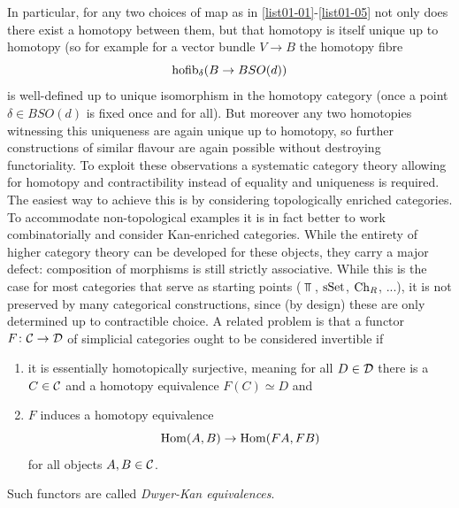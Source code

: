     In particular, for any two choices of map as in \ref{list01-01}-\ref{list01-05} not only does there exist a homotopy between them, but that homotopy is itself unique up to homotopy (so for example for a vector bundle $V \to B$ the homotopy fibre
    \begin{equation*}
        \operatorname{hofib}_{\delta}(B \to BSO(d))
    \end{equation*}
    is well-defined up to unique isomorphism in the homotopy category (once a point $\delta \in BSO(d)$ is fixed once and for all). But moreover any two homotopies witnessing this uniqueness are again unique up to homotopy, so further constructions of similar flavour are again possible without destroying functoriality.
    To exploit these observations a systematic category theory allowing for homotopy and contractibility instead of equality and uniqueness is required. The easiest way to achieve this is by considering topologically enriched categories. To accommodate non-topological examples it is in fact better to work combinatorially and consider Kan-enriched categories. While the entirety of higher category theory can be developed for these objects, they carry a major defect: composition of morphisms is still strictly associative. While this is the case for most categories that serve as starting points ($\Top$, $\operatorname{sSet}$, $\operatorname{Ch}_R$, ...), it is not preserved by many categorical constructions, since (by design) these are only determined up to contractible choice.
    A related problem is that a functor $F \colon \mathcal{C} \to \mathcal{D}$ of simplicial categories ought to be considered invertible if
    \begin{enumerate}[label=\arabic*)]
        \item it is essentially homotopically surjective, meaning for all $D \in \mathcal{D}$ there is a $C \in \mathcal{C}$ and a homotopy equivalence $F(C) \simeq D$ and
        \item $F$ induces a homotopy equivalence 
        \begin{equation*}
            \operatorname{Hom}(A, B) \to \operatorname{Hom}(FA, FB)
        \end{equation*}
        for all objects $A, B \in \mathcal{C}$.
    \end{enumerate}
    Such functors are called \emph{Dwyer-Kan equivalences}. 

